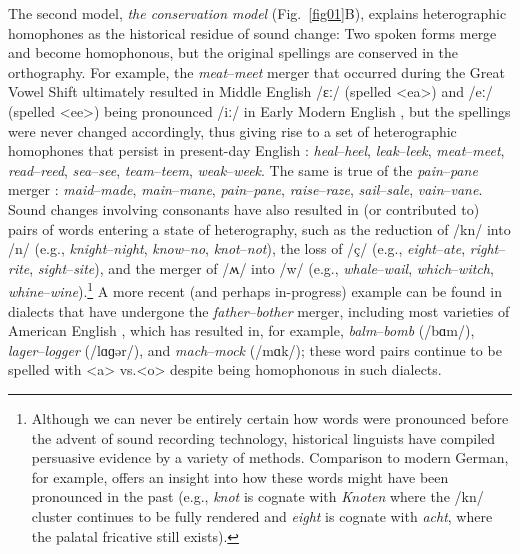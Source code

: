 \documentclass[doc,biblatex]{apa7}
\begin{document}
The second model, \textit{the conservation model} (Fig.~\ref{fig01}B), explains heterographic homophones as the historical residue of sound change: Two spoken forms merge and become homophonous, but the original spellings are conserved in the orthography. For example, the \textit{meat}--\textit{meet} merger that occurred during the Great Vowel Shift ultimately resulted in Middle English /ɛː/ (spelled <ea>) and /eː/ (spelled <ee>) being pronounced /iː/ in Early Modern English \parencite{Lass:2000}, but the spellings were never changed accordingly, thus giving rise to a set of heterographic homophones that persist in present-day English \parencite[pp.~140--141]{Wells:1982}: \textit{heal}--\textit{heel}, \textit{leak}--\textit{leek}, \textit{meat}--\textit{meet}, \textit{read}--\textit{reed}, \textit{sea}--\textit{see}, \textit{team}--\textit{teem}, \textit{weak}--\textit{week}. The same is true of the \textit{pain}--\textit{pane} merger \parencite[pp.~141--142]{Wells:1982}: \textit{maid}--\textit{made}, \textit{main}--\textit{mane}, \textit{pain}--\textit{pane}, \textit{raise}--\textit{raze}, \textit{sail}--\textit{sale}, \textit{vain}--\textit{vane}. Sound changes involving consonants have also resulted in (or contributed to) pairs of words entering a state of heterography, such as the reduction of /kn/ into /n/ (e.g., \textit{knight}--\textit{night}, \textit{know}--\textit{no}, \textit{knot}--\textit{not}), the loss of /ç/ (e.g., \textit{eight}--\textit{ate}, \textit{right}--\textit{rite}, \textit{sight}--\textit{site}), and the merger of /ʍ/ into /w/ (e.g., \textit{whale}--\textit{wail}, \textit{which}--\textit{witch}, \textit{whine}--\textit{wine}).\footnote{Although we can never be entirely certain how words were pronounced before the advent of sound recording technology, historical linguists have compiled persuasive evidence by a variety of methods. Comparison to modern German, for example, offers an insight into how these words might have been pronounced in the past (e.g., \textit{knot} is cognate with \textit{Knoten} where the /kn/ cluster continues to be fully rendered and \textit{eight} is cognate with \textit{acht}, where the palatal fricative still exists).} A more recent (and perhaps in-progress) example can be found in dialects that have undergone the \textit{father}--\textit{bother} merger, including most varieties of American English \parencite[p.~169]{Labov:2005}, which has resulted in, for example, \textit{balm}--\textit{bomb} (/bɑm/), \textit{lager}--\textit{logger} (/lɑɡər/), and \textit{mach}--\textit{mock} (/mɑk/); these word pairs continue to be spelled with <a> vs.\@ <o> despite being homophonous in such dialects.
\end{document}
